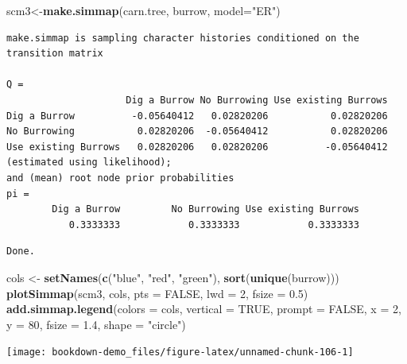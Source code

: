 \documentclass[
]{book}
\newenvironment{Shaded}{\begin{snugshade}}{\end{snugshade}}
\newcommand{\DataTypeTok}[1]{\textcolor[rgb]{0.13,0.29,0.53}{#1}}
\newcommand{\DecValTok}[1]{\textcolor[rgb]{0.00,0.00,0.81}{#1}}
\newcommand{\FloatTok}[1]{\textcolor[rgb]{0.00,0.00,0.81}{#1}}
\newcommand{\KeywordTok}[1]{\textcolor[rgb]{0.13,0.29,0.53}{\textbf{#1}}}
\newcommand{\NormalTok}[1]{#1}
\newcommand{\OtherTok}[1]{\textcolor[rgb]{0.56,0.35,0.01}{#1}}
\newcommand{\StringTok}[1]{\textcolor[rgb]{0.31,0.60,0.02}{#1}}
\begin{document}
\begin{Shaded}
\begin{Highlighting}[]
\NormalTok{scm3\textless{}{-}}\KeywordTok{make.simmap}\NormalTok{(carn.tree, burrow, }\DataTypeTok{model=}\StringTok{"ER"}\NormalTok{)}
\end{Highlighting}
\end{Shaded}

\begin{verbatim}
make.simmap is sampling character histories conditioned on the transition matrix

Q =
                     Dig a Burrow No Burrowing Use existing Burrows
Dig a Burrow          -0.05640412   0.02820206           0.02820206
No Burrowing           0.02820206  -0.05640412           0.02820206
Use existing Burrows   0.02820206   0.02820206          -0.05640412
(estimated using likelihood);
and (mean) root node prior probabilities
pi =
        Dig a Burrow         No Burrowing Use existing Burrows 
           0.3333333            0.3333333            0.3333333 
\end{verbatim}

\begin{verbatim}
Done.
\end{verbatim}

\begin{Shaded}
\begin{Highlighting}[]
\NormalTok{cols \textless{}{-}}\StringTok{ }\KeywordTok{setNames}\NormalTok{(}\KeywordTok{c}\NormalTok{(}\StringTok{"blue"}\NormalTok{, }\StringTok{"red"}\NormalTok{, }\StringTok{"green"}\NormalTok{), }\KeywordTok{sort}\NormalTok{(}\KeywordTok{unique}\NormalTok{(burrow)))}
\KeywordTok{plotSimmap}\NormalTok{(scm3, cols, }\DataTypeTok{pts =} \OtherTok{FALSE}\NormalTok{, }\DataTypeTok{lwd =} \DecValTok{2}\NormalTok{, }\DataTypeTok{fsize =} \FloatTok{0.5}\NormalTok{)}
\KeywordTok{add.simmap.legend}\NormalTok{(}\DataTypeTok{colors =}\NormalTok{ cols, }\DataTypeTok{vertical =} \OtherTok{TRUE}\NormalTok{, }\DataTypeTok{prompt =} \OtherTok{FALSE}\NormalTok{, }\DataTypeTok{x =} \DecValTok{2}\NormalTok{, }\DataTypeTok{y =} \DecValTok{80}\NormalTok{, }\DataTypeTok{fsize =} \FloatTok{1.4}\NormalTok{, }\DataTypeTok{shape =} \StringTok{"circle"}\NormalTok{)}
\end{Highlighting}
\end{Shaded}

\begin{center}\texttt{[image: bookdown-demo\_files/figure-latex/unnamed-chunk-106-1]} \end{center}
\end{document}

